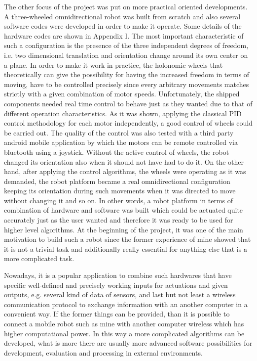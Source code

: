 \documentclass[12pt,english,twoside]{article}
\begin{document}
The other focus of the project was put on more practical oriented developments. A three-wheeled omnidirectional robot was built from scratch and also several software codes were developed in order to make it operate. Some details of the hardware codes are shown in Appendix I. The most important characteristic of such a configuration is the presence of the three independent degrees of freedom, i.e. two dimensional translation and orientation change around its own center on a plane. In order to make it work in practice, the holonomic wheels that theoretically can give the possibility for having the increased freedom in terms of moving, have to be controlled precisely since every arbitrary movements matches strictly with a given combination of motor speeds. Unfortunately, the shipped components needed real time control to behave just as they wanted due to that of different operation characteristics. As it was shown, applying the classical PID control methodology for each motor independently, a good control of wheels could be carried out. The quality of the control was also tested with a third party android mobile application by which the motors can be remote controlled via bluetooth using a joystick. Without the active control of wheels, the robot changed its orientation also when it should not have had to do it. On the other hand, after applying the control algorithms, the wheels were operating as it was demanded, the robot platform became a real omnidirectional configuration keeping its orientation during such movements when it was directed to move without changing it and so on. In other words, a robot platform in terms of combination of hardware and software was built which could be actuated quite accurately just as the user wanted and therefore it was ready to be used for higher level algorithms. At the beginning of the project, it was one of the main motivation to build such a robot since the former experience of mine showed that it is not a trivial task and additionally really essential for anything else that is a more complicated task.

Nowadays, it is a popular application to combine such hardwares that have specific well-defined and precisely working inputs for actuations and given outputs, e.g. several kind of data of sensors, and last but not least a wireless communication protocol to exchange information with an another computer in a convenient way. If the former things can be provided, than it is possible to connect a mobile robot such as mine with another computer wireless which has higher computational power. In this way a more complicated algorithms can be developed, what is more there are usually more advanced software possibilities for development, evaluation and processing in external environments. 
\end{document}
